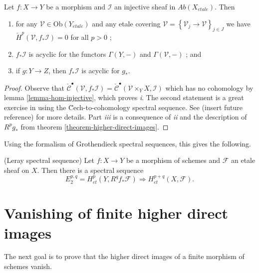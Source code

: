 \begin{lemma}
\label{lemma-prepare-leray}
Let $f: X\to Y$ be a morphism and $\mathcal{I}$ an injective sheaf in
$\textit{Ab}(X_{etale})$. Then
\begin{enumerate}
\item
for any $\mathcal{V}\in\text{Ob}(Y_{etale})$ and any etale covering
$\mathcal{V}=\left\{\mathcal{V}_j\to \mathcal{V}\right\}_{j\in J}$ we have
$\check H^p(\mathcal{V}, f_*\mathcal{I}) = 0$ for all $p>0$ ;
\item
$f_*\mathcal{I}$ is acyclic for the functors $\Gamma(Y, -)$ and
$\Gamma(\mathcal{V},-)$ ; and
\item
if $g: Y\to Z$, then $f_*\mathcal{I}$ is acyclic for $g_*$.
\end{enumerate}
\end{lemma}

\begin{proof}
Observe that $\check{\mathcal{C}}^\bullet(\mathcal{V}, f_*\mathcal{I}) =
\check{\mathcal{C}}^\bullet(\mathcal{V}\times_Y X, \mathcal{I})$ which has no
cohomology by lemma \ref{lemma-hom-injective}, which proves {\it i}. The
second statement is a great exercise in using the \u Cech-to-cohomology
spectral sequence. See (insert future reference) for more details. Part {\it
iii} is a consequence of {\it ii} and the description of $R^pg_*$ from theorem
\ref{theorem-higher-direct-images}.
\end{proof}

\noindent
Using the formalism of Grothendieck spectral sequences, this gives the
following.

\begin{proposition}
\label{proposition-leray}
(Leray spectral sequence)
Let $f: X \to Y$ be a morphism of schemes and $\mathcal{F}$ an etale sheaf on
$X$. Then there is a spectral sequence
$$
E_2^{p,q} = H_{et}^p(Y, R^qf_*\mathcal{F}) \Rightarrow H_{et}^{p+q}(X,
\mathcal{F}).
$$
\end{proposition}









\section{Vanishing of finite higher direct images}
\label{section-vanishing-finite-morphism}

\noindent
The next goal is to prove that the higher direct images of a finite morphism of
schemes vanish.

